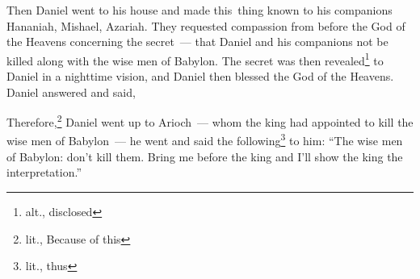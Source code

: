 \begin{inparaenum}
     Then Daniel went to his house and made this\understood\ thing known to his companions Hananiah, Mishael, Azariah.%
     They requested compassion from before the God of the Heavens concerning the secret~--- that Daniel and his companions not be killed along with the wise men of Babylon.%
     The secret was then revealed\footnote{alt., disclosed} to Daniel in a nighttime vision, and Daniel then blessed the God of the Heavens.%
     Daniel answered and said,%
    
    
    
    
    
    
    
    
    
    
    \noindent{} Therefore,\footnote{lit., Because of this} Daniel went up to Arioch~--- whom the king had appointed to kill the wise men of Babylon~--- he went and said the following\footnote{lit., thus} to him: ``The wise men of Babylon: don't kill them. Bring me before the king and I'll show the king the interpretation.''%
    

\end{inparaenum}
